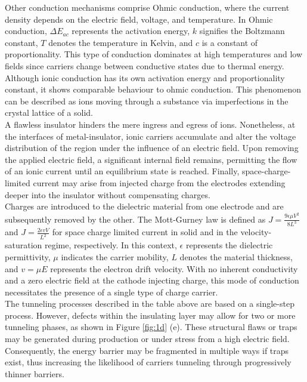 \noindent Other conduction mechanisms comprise Ohmic conduction, where the current density depends on the electric field, voltage, and temperature. In Ohmic conduction, $\Delta E_{ac}$ represents the activation energy, $k$ signifies the Boltzmann constant, $T$ denotes the temperature in Kelvin, and $c$ is a constant of proportionality. This type of conduction dominates at high temperatures and low fields since carriers change between conductive states due to thermal energy. Although ionic conduction has its own activation energy and proportionality constant, it shows comparable behaviour to ohmic conduction. This phenomenon can be described as ions moving through a substance via imperfections in the crystal lattice of a solid. \\

\noindent A flawless insulator hinders the mere ingress and egress of ions. Nonetheless, at the interfaces of metal-insulator, ionic carriers accumulate and alter the voltage distribution of the region under the influence of an electric field. Upon removing the applied electric field, a significant internal field remains, permitting the flow of an ionic current until an equilibrium state is reached. Finally, space-charge-limited current may arise from injected charge from the electrodes extending deeper into the insulator without compensating charges.\\

\noindent Charges are introduced to the dielectric material from one electrode and are subsequently removed by the other. The Mott-Gurney law is defined as $J=\frac{9\epsilon\mu V^2}{8L^3}$ and $J=\frac{2\epsilon vV}{L^2}$ for space charge limited current in solid and in the velocity-saturation regime, respectively. In this context, $\epsilon$ represents the dielectric permittivity, $\mu$ indicates the carrier mobility, $L$ denotes the material thickness, and $v = \mu E$ represents the electron drift velocity. With no inherent conductivity and a zero electric field at the cathode injecting charge, this mode of conduction necessitates the presence of a single type of charge carrier.\\

\noindent The tunneling processes described in the table above are based on a single-step process. However, defects within the insulating layer may allow for two or more tunneling phases, as shown in Figure \ref{fig:1d} (e). These structural flaws or traps may be generated during production or under stress from a high electric field. Consequently, the energy barrier may be fragmented in multiple ways if traps exist, thus increasing the likelihood of carriers tunneling through progressively thinner barriers.\\

